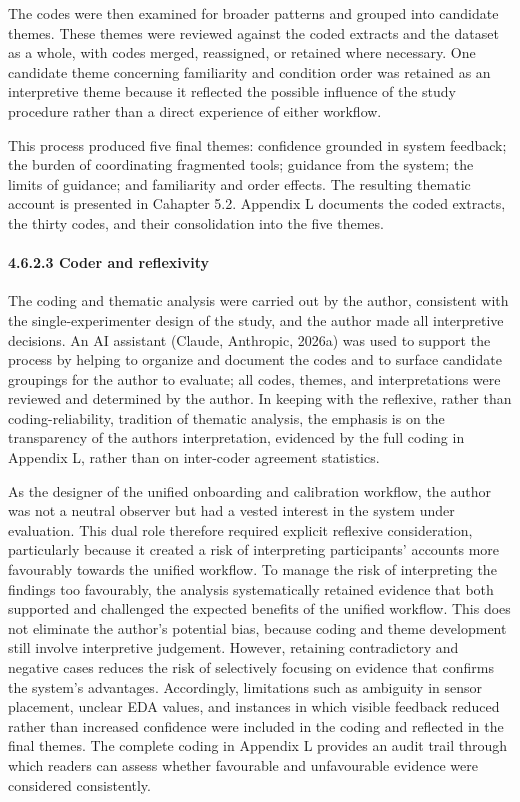 \documentclass[
]{article}
\begin{document}
The codes were then examined for broader patterns and grouped into candidate themes. These themes were reviewed against the coded extracts and the dataset as a whole, with codes merged, reassigned, or retained where necessary. One candidate theme concerning familiarity and condition order was retained as an interpretive theme because it reflected the possible influence of the study procedure rather than a direct experience of either workflow.

This process produced five final themes: confidence grounded in system feedback; the burden of coordinating fragmented tools; guidance from the system; the limits of guidance; and familiarity and order effects. The resulting thematic account is presented in Cahapter 5.2. Appendix L documents the coded extracts, the thirty codes, and their consolidation into the five themes.

\hypertarget{coder-and-reflexivity}{%
\paragraph{4.6.2.3 Coder and reflexivity}\label{coder-and-reflexivity}}

The coding and thematic analysis were carried out by the author, consistent with the single-experimenter design of the study, and the author made all interpretive decisions. An AI assistant (Claude, Anthropic, 2026a) was used to support the process by helping to organize and document the codes and to surface candidate groupings for the author to evaluate; all codes, themes, and interpretations were reviewed and determined by the author. In keeping with the reflexive, rather than coding-reliability, tradition of thematic analysis, the emphasis is on the transparency of the author\textquotesingle s interpretation, evidenced by the full coding in Appendix L, rather than on inter-coder agreement statistics.

As the designer of the unified onboarding and calibration workflow, the author was not a neutral observer but had a vested interest in the system under evaluation. This dual role therefore required explicit reflexive consideration, particularly because it created a risk of interpreting participants' accounts more favourably towards the unified workflow. To manage the risk of interpreting the findings too favourably, the analysis systematically retained evidence that both supported and challenged the expected benefits of the unified workflow. This does not eliminate the author's potential bias, because coding and theme development still involve interpretive judgement. However, retaining contradictory and negative cases reduces the risk of selectively focusing on evidence that confirms the system's advantages. Accordingly, limitations such as ambiguity in sensor placement, unclear EDA values, and instances in which visible feedback reduced rather than increased confidence were included in the coding and reflected in the final themes. The complete coding in Appendix L provides an audit trail through which readers can assess whether favourable and unfavourable evidence were considered consistently.
\end{document}
